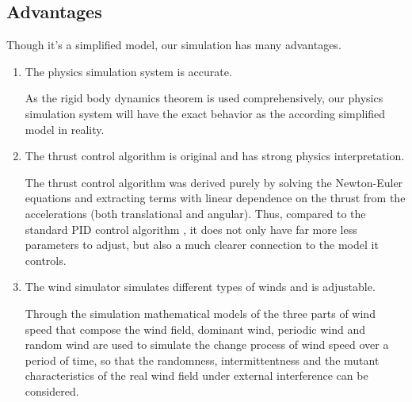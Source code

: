 \subsection{Advantages}
Though it's a simplified model, our simulation has many advantages.
\begin{enumerate}
    \item The physics simulation system is accurate.
    
    As the rigid body dynamics theorem is used comprehensively, our physics simulation system will have the exact behavior as the according simplified model in reality.
    \item The thrust control algorithm is original and has strong physics interpretation.
    
    The thrust control algorithm was derived purely by solving the Newton-Euler equations and extracting terms with linear dependence on the thrust from the  accelerations (both translational and angular). Thus, compared to the standard PID control algorithm \cite{bib4}, it does not only have far more less parameters to adjust, but also a much clearer connection to the model it controls.
    
    \item The wind simulator simulates different types of winds and is adjustable.
    
    Through the simulation mathematical models of the three parts of wind speed that compose the wind field, dominant wind, periodic wind and random wind are used to simulate the change process of wind speed over a period of time, so that the randomness, intermittentness and the mutant characteristics of the real wind field under external interference can be considered. 
    
\end{enumerate}

